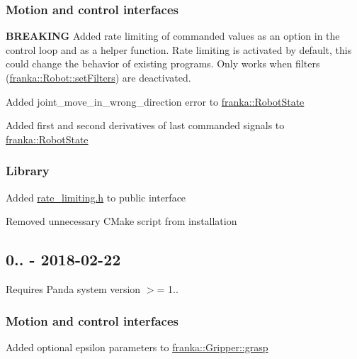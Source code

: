 \subsubsection*{Motion and control interfaces}


\begin{DoxyItemize}
\item {\bfseries B\+R\+E\+A\+K\+I\+NG} Added rate limiting of commanded values as an option in the control loop and as a helper function. Rate limiting is activated by default, this could change the behavior of existing programs. Only works when filters ({\ttfamily \hyperlink{classfranka_1_1Robot_aebce1a0dbe3b139bb24001845b2afe07}{franka\+::\+Robot\+::set\+Filters}}) are deactivated.
\item Added {\ttfamily joint\+\_\+move\+\_\+in\+\_\+wrong\+\_\+direction} error to {\ttfamily \hyperlink{structfranka_1_1RobotState}{franka\+::\+Robot\+State}}
\item Added first and second derivatives of last commanded signals to {\ttfamily \hyperlink{structfranka_1_1RobotState}{franka\+::\+Robot\+State}}
\end{DoxyItemize}

\subsubsection*{Library}


\begin{DoxyItemize}
\item Added {\ttfamily \hyperlink{rate__limiting_8h}{rate\+\_\+limiting.\+h}} to public interface
\item Removed unnecessary C\+Make script from installation
\end{DoxyItemize}

\subsection*{0.. -\/ 2018-\/02-\/22}

Requires Panda system version $>$= 1..

\subsubsection*{Motion and control interfaces}


\begin{DoxyItemize}
\item Added optional {\ttfamily epsilon} parameters to {\ttfamily \hyperlink{classfranka_1_1Gripper_abff6a03a6c75b9079bd4b9b5ca380254}{franka\+::\+Gripper\+::grasp}}
\end{DoxyItemize}

